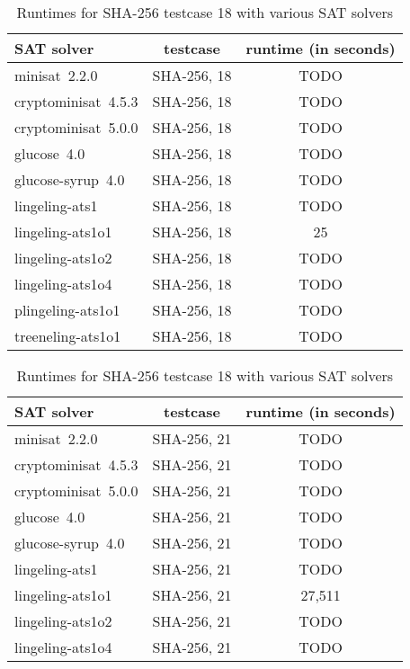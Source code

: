 \begin{table}[!h]
  \begin{center}
    \begin{tabular}{lcc}
      SAT solver                & testcase      & runtime (in seconds) \\
    \hline
      minisat~2.2.0             & SHA-256, 18   & TODO \\
      cryptominisat~4.5.3       & SHA-256, 18   & TODO \\
      cryptominisat~5.0.0       & SHA-256, 18   & TODO \\
      glucose~4.0               & SHA-256, 18   & TODO \\
      glucose-syrup~4.0         & SHA-256, 18   & TODO \\
      lingeling-ats1            & SHA-256, 18   & TODO \\
      lingeling-ats1o1          & SHA-256, 18   & 25 \\
      lingeling-ats1o2          & SHA-256, 18   & TODO \\
      lingeling-ats1o4          & SHA-256, 18   & TODO \\
      plingeling-ats1o1         & SHA-256, 18   & TODO \\
      treeneling-ats1o1         & SHA-256, 18   & TODO
    \end{tabular}
    \caption{Runtimes for SHA-256 testcase 18 with various SAT solvers}
    \label{tab:SHA-256-18-runtimes}
  \end{center}
  \begin{center}
    \begin{tabular}{lcc}
      SAT solver                & testcase      & runtime (in seconds) \\
    \hline
      minisat~2.2.0             & SHA-256, 21   & TODO \\
      cryptominisat~4.5.3       & SHA-256, 21   & TODO \\
      cryptominisat~5.0.0       & SHA-256, 21   & TODO \\
      glucose~4.0               & SHA-256, 21   & TODO \\
      glucose-syrup~4.0         & SHA-256, 21   & TODO \\
      lingeling-ats1            & SHA-256, 21   & TODO \\
      lingeling-ats1o1          & SHA-256, 21   & 27,511 \\
      lingeling-ats1o2          & SHA-256, 21   & TODO \\
      lingeling-ats1o4          & SHA-256, 21   & TODO \\

\end{tabular}
\end{center}
\end{table}
